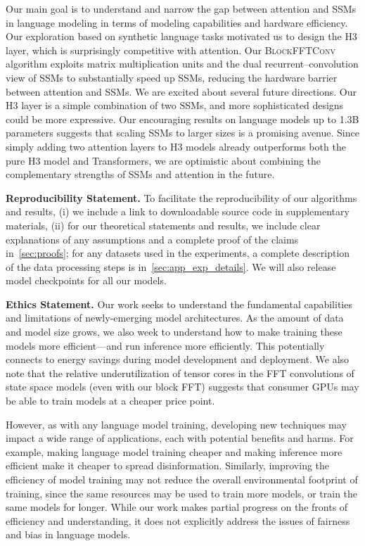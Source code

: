 Our main goal is to understand and narrow the gap between attention and SSMs in language modeling in terms of modeling capabilities and hardware efficiency. Our exploration based on synthetic language tasks motivated us to design the
\textsc{H3} layer, which is surprisingly competitive with attention. Our \textsc{BlockFFTConv} algorithm exploits matrix multiplication units and the dual recurrent--convolution view of SSMs to substantially speed up SSMs, reducing the hardware barrier between attention and SSMs. We are excited about several future directions. Our \textsc{H3} layer is a simple combination of two SSMs, and more sophisticated designs could be more expressive. Our encouraging results on language models up to 1.3B parameters suggests that scaling SSMs to larger sizes is a promising avenue. Since simply adding two attention layers to \textsc{H3} models already outperforms both the pure \textsc{H3} model and Transformers, we are optimistic about combining the complementary strengths of SSMs and attention in the future.

\ifarxiv

\else
\textbf{Reproducibility Statement.} To facilitate the reproducibility of our algorithms and results, (i) we include a link to downloadable source code in supplementary materials, (ii) for our theoretical statements and results, we include clear explanations of any assumptions and a complete proof of the claims
in~\ref{sec:proofs}; for any datasets used in the experiments, a complete description of the data processing steps is in~\ref{sec:app_exp_details}.
We will also release model checkpoints for all our models.

\textbf{Ethics Statement.} Our work seeks to understand the fundamental capabilities and limitations of newly-emerging model architectures. As the amount of data and model size grows, we also week to understand how to make training these models more efficient---and run inference more efficiently. This potentially connects to energy savings during model development and deployment. We also note that the relative underutilization of tensor cores in the FFT convolutions of state space models (even with our block FFT) suggests that consumer GPUs may be able to train models at a cheaper price point.

However, as with any language model training, developing new techniques may impact a wide range of applications, each with potential benefits and harms. For example, making language model training cheaper and making inference more efficient make it cheaper to spread disinformation. Similarly, improving the efficiency of model training may not reduce the overall environmental footprint of training, since the same resources may be used to train more models, or train the same models for longer. While our work makes partial progress on the fronts of efficiency and understanding, it does not explicitly address the issues of fairness and bias in language models.
\fi


